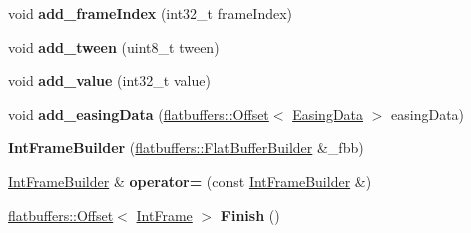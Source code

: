 \begin{DoxyCompactItemize}
\item 
\mbox{\label{structflatbuffers_1_1IntFrameBuilder_a8014d6133f45a2f373571b68b00ba34f}} 
void {\bfseries add\+\_\+frame\+Index} (int32\+\_\+t frame\+Index)
\item 
\mbox{\label{structflatbuffers_1_1IntFrameBuilder_a3d5b707c5329d14f11df65393791648a}} 
void {\bfseries add\+\_\+tween} (uint8\+\_\+t tween)
\item 
\mbox{\label{structflatbuffers_1_1IntFrameBuilder_a40183b4cc05cee7bb8dd81389c2fb151}} 
void {\bfseries add\+\_\+value} (int32\+\_\+t value)
\item 
\mbox{\label{structflatbuffers_1_1IntFrameBuilder_a1d8d29f6c1a12c3153e380462fe7b345}} 
void {\bfseries add\+\_\+easing\+Data} (\hyperlink{structflatbuffers_1_1Offset}{flatbuffers\+::\+Offset}$<$ \hyperlink{structflatbuffers_1_1EasingData}{Easing\+Data} $>$ easing\+Data)
\item 
\mbox{\label{structflatbuffers_1_1IntFrameBuilder_a65b19ec140cab367db204b764e2ca2e3}} 
{\bfseries Int\+Frame\+Builder} (\hyperlink{classflatbuffers_1_1FlatBufferBuilder}{flatbuffers\+::\+Flat\+Buffer\+Builder} \&\+\_\+fbb)
\item 
\mbox{\label{structflatbuffers_1_1IntFrameBuilder_a146c7f418bc7254499335a1d5d97bd6c}} 
\hyperlink{structflatbuffers_1_1IntFrameBuilder}{Int\+Frame\+Builder} \& {\bfseries operator=} (const \hyperlink{structflatbuffers_1_1IntFrameBuilder}{Int\+Frame\+Builder} \&)
\item 
\mbox{\label{structflatbuffers_1_1IntFrameBuilder_a99ffab51b16723e023386d0e3dfcab3f}} 
\hyperlink{structflatbuffers_1_1Offset}{flatbuffers\+::\+Offset}$<$ \hyperlink{structflatbuffers_1_1IntFrame}{Int\+Frame} $>$ {\bfseries Finish} ()
\end{DoxyCompactItemize}
